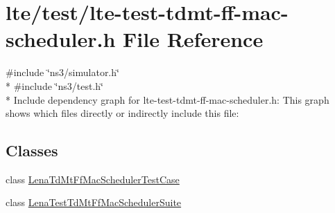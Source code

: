\hypertarget{lte-test-tdmt-ff-mac-scheduler_8h}{}\section{lte/test/lte-\/test-\/tdmt-\/ff-\/mac-\/scheduler.h File Reference}
\label{lte-test-tdmt-ff-mac-scheduler_8h}
{\ttfamily \#include \char`\"{}ns3/simulator.\+h\char`\"{}}\\*
{\ttfamily \#include \char`\"{}ns3/test.\+h\char`\"{}}\\*
Include dependency graph for lte-\/test-\/tdmt-\/ff-\/mac-\/scheduler.h\+:
This graph shows which files directly or indirectly include this file\+:
\subsection*{Classes}
\begin{DoxyCompactItemize}
\item 
class \hyperlink{classLenaTdMtFfMacSchedulerTestCase}{Lena\+Td\+Mt\+Ff\+Mac\+Scheduler\+Test\+Case}
\item 
class \hyperlink{classLenaTestTdMtFfMacSchedulerSuite}{Lena\+Test\+Td\+Mt\+Ff\+Mac\+Scheduler\+Suite}
\end{DoxyCompactItemize}
